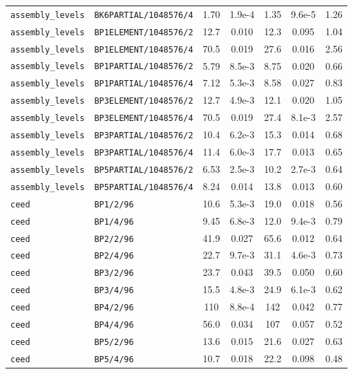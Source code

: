 \begin{tabular}{ll S[table-format=3.4e-1] S[table-format=1.2e-1] S[table-format=3.4e-1] S[table-format=1.2e-1] S[table-format=2.2]}
\texttt{assembly\_levels} & \texttt{BK6PARTIAL/1048576/4} & 1.70 & 1.9e-4 & 1.35 & 9.6e-5 & 1.26 \\
\texttt{assembly\_levels} & \texttt{BP1ELEMENT/1048576/2} & 12.7 & 0.010 & 12.3 & 0.095 & 1.04 \\
\texttt{assembly\_levels} & \texttt{BP1ELEMENT/1048576/4} & 70.5 & 0.019 & 27.6 & 0.016 & 2.56 \\
\texttt{assembly\_levels} & \texttt{BP1PARTIAL/1048576/2} & 5.79 & 8.5e-3 & 8.75 & 0.020 & 0.66 \\
\texttt{assembly\_levels} & \texttt{BP1PARTIAL/1048576/4} & 7.12 & 5.3e-3 & 8.58 & 0.027 & 0.83 \\
\texttt{assembly\_levels} & \texttt{BP3ELEMENT/1048576/2} & 12.7 & 4.9e-3 & 12.1 & 0.020 & 1.05 \\
\texttt{assembly\_levels} & \texttt{BP3ELEMENT/1048576/4} & 70.5 & 0.019 & 27.4 & 8.1e-3 & 2.57 \\
\texttt{assembly\_levels} & \texttt{BP3PARTIAL/1048576/2} & 10.4 & 6.2e-3 & 15.3 & 0.014 & 0.68 \\
\texttt{assembly\_levels} & \texttt{BP3PARTIAL/1048576/4} & 11.4 & 6.0e-3 & 17.7 & 0.013 & 0.65 \\
\texttt{assembly\_levels} & \texttt{BP5PARTIAL/1048576/2} & 6.53 & 2.5e-3 & 10.2 & 2.7e-3 & 0.64 \\
\texttt{assembly\_levels} & \texttt{BP5PARTIAL/1048576/4} & 8.24 & 0.014 & 13.8 & 0.013 & 0.60 \\
\texttt{ceed} & \texttt{BP1/2/96} & 10.6 & 5.3e-3 & 19.0 & 0.018 & 0.56 \\
\texttt{ceed} & \texttt{BP1/4/96} & 9.45 & 6.8e-3 & 12.0 & 9.4e-3 & 0.79 \\
\texttt{ceed} & \texttt{BP2/2/96} & 41.9 & 0.027 & 65.6 & 0.012 & 0.64 \\
\texttt{ceed} & \texttt{BP2/4/96} & 22.7 & 9.7e-3 & 31.1 & 4.6e-3 & 0.73 \\
\texttt{ceed} & \texttt{BP3/2/96} & 23.7 & 0.043 & 39.5 & 0.050 & 0.60 \\
\texttt{ceed} & \texttt{BP3/4/96} & 15.5 & 4.8e-3 & 24.9 & 6.1e-3 & 0.62 \\
\texttt{ceed} & \texttt{BP4/2/96} & 110 & 8.8e-4 & 142 & 0.042 & 0.77 \\
\texttt{ceed} & \texttt{BP4/4/96} & 56.0 & 0.034 & 107 & 0.057 & 0.52 \\
\texttt{ceed} & \texttt{BP5/2/96} & 13.6 & 0.015 & 21.6 & 0.027 & 0.63 \\
\texttt{ceed} & \texttt{BP5/4/96} & 10.7 & 0.018 & 22.2 & 0.098 & 0.48 \\

\end{tabular}
